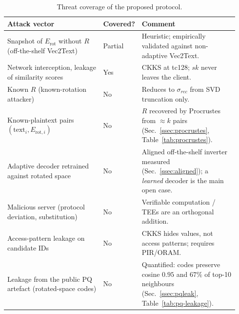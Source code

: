 \documentclass[11pt,a4paper]{article}
\begin{document}
\begin{table}[t]
\centering
\caption{Threat coverage of the proposed protocol.}\label{tab:threat}
\small
\begin{tabular}{@{}p{0.42\linewidth}p{0.10\linewidth}p{0.42\linewidth}@{}}
\toprule
\textbf{Attack vector} & \textbf{Covered?} & \textbf{Comment} \\ \midrule
Snapshot of $E_{\mathrm{rot}}$ without $R$ (off-the-shelf Vec2Text) &
Partial &
Heuristic; empirically validated against non-adaptive Vec2Text. \\
Network interception, leakage of similarity scores &
Yes &
CKKS at tc128; $sk$ never leaves the client. \\
Known $R$ (known-rotation attacker) &
No &
Reduces to $\sigma_{rec}$ from SVD truncation only. \\
Known-plaintext pairs $(\mathrm{text}_i, E_{\mathrm{rot},i})$ &
No &
$R$ recovered by Procrustes from $\approx k$ pairs
(Sec.~\ref{ssec:procrustes}, Table~\ref{tab:procrustes}). \\
Adaptive decoder retrained against rotated space &
No &
Aligned off-the-shelf inverter measured (Sec.~\ref{ssec:aligned}); a
\emph{learned} decoder is the main open case. \\
Malicious server (protocol deviation, substitution) &
No &
Verifiable computation / TEEs are an orthogonal addition. \\
Access-pattern leakage on candidate IDs &
No &
CKKS hides values, not access patterns; requires PIR/ORAM. \\
Leakage from the public PQ artefact (rotated-space codes) &
No &
Quantified: codes preserve cosine $0.95$ and $67\%$ of top-10 neighbours
(Sec.~\ref{ssec:pqleak}, Table~\ref{tab:pq-leakage}). \\
\bottomrule
\end{tabular}
\end{table}
\end{document}
